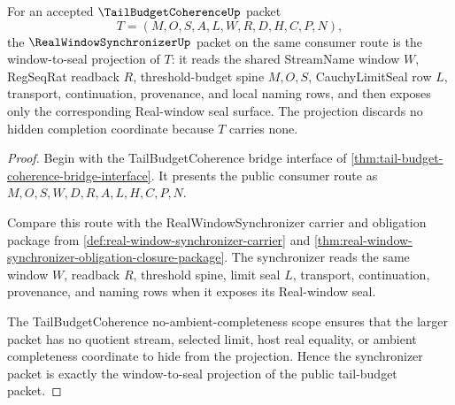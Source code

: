 \begin{theorem}
\label{thm:tail-budget-coherence-synchronizer-comparison}
For an accepted $\TailBudgetCoherenceUp$ packet
$$
T=(M,O,S,A,L,W,R,D,H,C,P,N),
$$
the $\RealWindowSynchronizerUp$ packet on the same consumer route is the window-to-seal projection of $T$: it reads the shared StreamName window $W$, RegSeqRat readback $R$, threshold-budget spine $M,O,S$, CauchyLimitSeal row $L$, transport, continuation, provenance, and local naming rows, and then exposes only the corresponding Real-window seal surface. The projection discards no hidden completion coordinate because $T$ carries none.
\end{theorem}
\begin{proof}
Begin with the TailBudgetCoherence bridge interface of \autoref{thm:tail-budget-coherence-bridge-interface}. It presents the public consumer route as $M,O,S,W,D,R,A,L,H,C,P,N$.

Compare this route with the RealWindowSynchronizer carrier and obligation package from \autoref{def:real-window-synchronizer-carrier} and \autoref{thm:real-window-synchronizer-obligation-closure-package}. The synchronizer reads the same window $W$, readback $R$, threshold spine, limit seal $L$, transport, continuation, provenance, and naming rows when it exposes its Real-window seal.

The TailBudgetCoherence no-ambient-completeness scope ensures that the larger packet has no quotient stream, selected limit, host real equality, or ambient completeness coordinate to hide from the projection. Hence the synchronizer packet is exactly the window-to-seal projection of the public tail-budget packet.
\end{proof}

